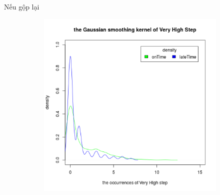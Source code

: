 \documentclass[a4paper, 13pt]{report}
\begin{document}
\FloatBarrier
Nếu gộp lại \\
\FloatBarrier
\begin{figure}[h]
    \begin{subfigure}[b]{0.7\textwidth}
        \includegraphics[width=\textwidth]{DensityVeryHighStep.png}
    \end{subfigure}
\end{figure}
\FloatBarrier
\end{document}
